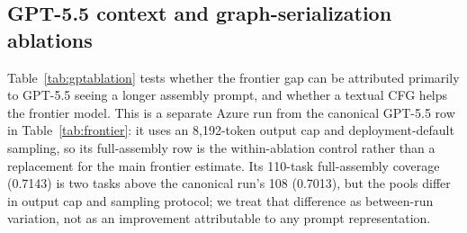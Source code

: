 \documentclass[11pt]{article}
\begin{document}
\subsection{GPT-5.5 context and graph-serialization ablations}

Table~\ref{tab:gptablation} tests whether the frontier gap can be attributed primarily to GPT-5.5 seeing a longer assembly prompt, and whether a textual CFG helps the frontier model. This is a separate Azure run from the canonical GPT-5.5 row in Table~\ref{tab:frontier}: it uses an 8{,}192-token output cap and deployment-default sampling, so its full-assembly row is the within-ablation control rather than a replacement for the main frontier estimate. Its 110-task full-assembly coverage (0.7143) is two tasks above the canonical run's 108 (0.7013), but the pools differ in output cap and sampling protocol; we treat that difference as between-run variation, not as an improvement attributable to any prompt representation.

\begin{table}[t]
\centering
\small
\caption{GPT-5.5 prompt-representation ablation on the same 154 tasks, with ten candidates per task. \emph{Covered} is the pass@10 numerator. Within-version comparisons are controlled; direct v1--v2 comparisons remain descriptive because the cleaner and system prompt changed.}
\label{tab:gptablation}
\end{table}
\end{document}
